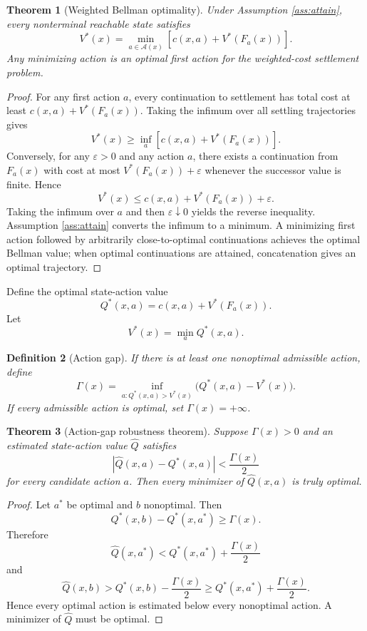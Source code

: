 \documentclass[11pt,letterpaper]{article}
\newtheorem{theorem}{Theorem}[section]
\newtheorem{definition}[theorem]{Definition}
\theoremstyle{remark}
\newcommand{\A}{\mathcal A}
\newcommand{\Qstar}{Q^{\!*}}
\begin{document}
\begin{theorem}[Weighted Bellman optimality]\label{thm:weightedbellman}
Under Assumption \ref{ass:attain}, every nonterminal reachable state satisfies
\[
\boxed{V^*(x)=\min_{a\in\A(x)}\left[c(x,a)+V^*(F_a(x))\right].}
\]
Any minimizing action is an optimal first action for the weighted-cost settlement problem.
\end{theorem}

\begin{proof}
For any first action $a$, every continuation to settlement has total cost at least $c(x,a)+V^*(F_a(x))$. Taking the infimum over all settling trajectories gives
\[
V^*(x)\ge \inf_a\left[c(x,a)+V^*(F_a(x))\right].
\]
Conversely, for any $\varepsilon>0$ and any action $a$, there exists a continuation from $F_a(x)$ with cost at most $V^*(F_a(x))+\varepsilon$ whenever the successor value is finite. Hence
\[
V^*(x)\le c(x,a)+V^*(F_a(x))+\varepsilon.
\]
Taking the infimum over $a$ and then $\varepsilon\downarrow0$ yields the reverse inequality. Assumption \ref{ass:attain} converts the infimum to a minimum. A minimizing first action followed by arbitrarily close-to-optimal continuations achieves the optimal Bellman value; when optimal continuations are attained, concatenation gives an optimal trajectory.
\end{proof}

Define the optimal state-action value
\[
\Qstar(x,a)=c(x,a)+V^*(F_a(x)).
\]
Let
\[
V^*(x)=\min_a\Qstar(x,a).
\]

\begin{definition}[Action gap]
If there is at least one nonoptimal admissible action, define
\[
\Gamma(x)=\inf_{a:\Qstar(x,a)>V^*(x)}\bigl(\Qstar(x,a)-V^*(x)\bigr).
\]
If every admissible action is optimal, set $\Gamma(x)=+\infty$.
\end{definition}

\begin{theorem}[Action-gap robustness theorem]\label{thm:gap}
Suppose $\Gamma(x)>0$ and an estimated state-action value $\widehat Q$ satisfies
\[
|\widehat Q(x,a)-\Qstar(x,a)|<\frac{\Gamma(x)}{2}
\]
for every candidate action $a$. Then every minimizer of $\widehat Q(x,a)$ is truly optimal.
\end{theorem}

\begin{proof}
Let $a^*$ be optimal and $b$ nonoptimal. Then
\[
\Qstar(x,b)-\Qstar(x,a^*)\ge\Gamma(x).
\]
Therefore
\[
\widehat Q(x,a^*)<\Qstar(x,a^*)+\frac{\Gamma(x)}2
\]
and
\[
\widehat Q(x,b)>\Qstar(x,b)-\frac{\Gamma(x)}2
\ge \Qstar(x,a^*)+\frac{\Gamma(x)}2.
\]
Hence every optimal action is estimated below every nonoptimal action. A minimizer of $\widehat Q$ must be optimal.
\end{proof}
\end{document}

